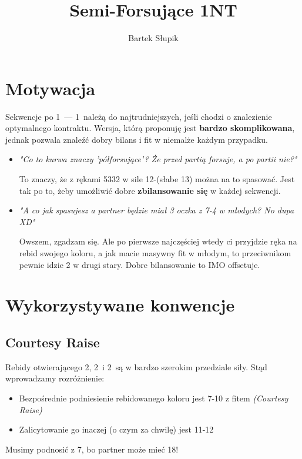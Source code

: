 \documentclass[12pt, a4paper]{article}
\title{Semi-Forsujące 1NT}
\author{Bartek Słupik}
\begin{document}
    \maketitle
    \section{Motywacja}
    Sekwencje po 1\major\ --- 1\nt\ należą do najtrudniejszych, jeśli chodzi o znalezienie 
    optymalnego kontraktu. Wersja, którą proponuję jest \textbf{bardzo skomplikowana},
    jednak pozwala znaleźć dobry bilans i fit w niemalże każdym przypadku.
    \begin{itemize}
        \item \emph{"Co to kurwa znaczy 'półforsujące'? Że przed partią forsuje, a po partii nie?"}
        
        To znaczy, że z rękami 5332 w sile 12-(słabe 13) można na to spasować. 
        Jest tak po to, żeby umożliwić dobre \textbf{zbilansowanie się} w każdej sekwencji.

        \item \emph{"A co jak spasujesz a partner będzie miał 3 oczka z 7-4 w młodych? No dupa XD"}
        
        Owszem, zgadzam się. Ale po pierwsze najczęściej wtedy ci przyjdzie ręka na rebid swojego koloru,
        a jak macie masywny fit w młodym, to przeciwnikom pewnie idzie 2 w drugi stary.
        Dobre bilansowanie to IMO offsetuje.
    \end{itemize}

    \pagebreak
    \section{Wykorzystywane konwencje}
    \subsection{Courtesy Raise}
    Rebidy otwierającego 2\clubs, 2\diams\ i 2\hearts\ są w bardzo szerokim przedziale siły.
    Stąd wprowadzamy rozróżnienie:
    \begin{itemize}
        \item Bezpośrednie podniesienie rebidowanego koloru jest 7-10 z fitem \emph{(Courtesy Raise)}
        \item Zalicytowanie go inaczej (o czym za chwilę) jest 11-12
    \end{itemize}
    Musimy podnosić z 7\hcp, bo partner może mieć 18!
\end{document}
